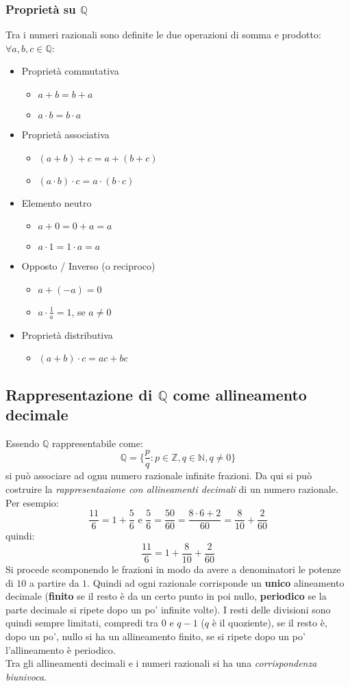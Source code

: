 \documentclass[a4paper,12pt, oneside]{book}
\begin{document}
\subsubsection{Proprietà su $\mathbb{Q}$} Tra i numeri razionali sono definite
le due operazioni di somma e prodotto:\\ $\forall a,b,c\in\mathbb{Q}$:
\begin{itemize}
  \item Proprietà commutativa
  \begin{itemize}
    \item $a+b=b+a$
    \item $a \cdot b=b \cdot a$
  \end{itemize}
  \item Proprietà associativa
  \begin{itemize}
    \item $(a+b)+c=a+(b+c)$
    \item $(a\cdot b)\cdot c=a\cdot(b\cdot c)$
  \end{itemize}
  \item Elemento neutro
  \begin{itemize}
    \item $a+0=0+a=a$
    \item $a\cdot 1=1\cdot a=a$
  \end{itemize}
  \item Opposto / Inverso (o reciproco)
  \begin{itemize}
    \item $a+(-a)=0$
    \item $a\cdot\frac1{a}=1$, se $a\neq0$
  \end{itemize}
  \item Proprietà distributiva
  \begin{itemize}
    \item $(a+b)\cdot c=ac+bc$
  \end{itemize}
\end{itemize}
\subsection{Rappresentazione di $\mathbb{Q}$ come allineamento decimale} Essendo
$\mathbb{Q}$ rappresentabile come:
$$\mathbb{Q} = \{\frac{p}{q} : p\in\mathbb{Z}, q\in\mathbb{N}, q \neq 0 \}$$
si può associare ad ognu numero razionale infinite frazioni.
Da qui si può costruire la \textit{rappresentazione con allineamenti decimali}
di un numero razionale. Per esempio:
$$\frac{11}{6}=1+\frac{5}{6} \mbox{ e } \frac{5}{6}=\frac{50}{60}=\frac{8\cdot 6+2}{60}=\frac{8}{10}+\frac{2}{60}$$
quindi: $$\frac{11}{6}=1+\frac{8}{10}+\frac{2}{60}$$ Si procede scomponendo le
frazioni in modo da avere a denominatori le potenze di $10$ a partire da
$1$. Quindi ad ogni razionale corrisponde un \textbf{unico} alineamento decimale
(\textbf{finito} se il resto è da un certo punto in poi nullo,
\textbf{periodico} se la parte decimale si ripete dopo un po' infinite volte). I
resti delle divisioni sono quindi sempre limitati, compredi tra $0$ e $q-1$ ($q$
è il quoziente), se il resto è, dopo un po', nullo si ha un allineamento finito,
se si ripete dopo un po' l'allineamento è periodico.\\Tra gli allineamenti
decimali e i numeri razionali si ha una \textit{corrispondenza biunivoca}.
\end{document}
